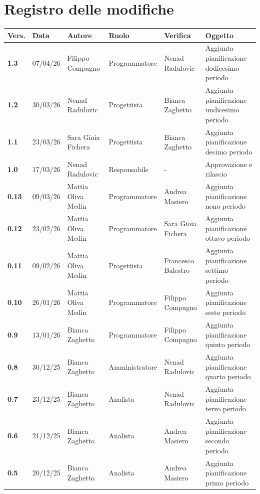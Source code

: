 \documentclass[a4paper,12pt]{article}
\begin{document}


\newpage
\section*{Registro delle modifiche}
\begin{xltabular}{\textwidth}{|l|l|X|l|X|X|}
\hline
\textbf{Vers.} & \textbf{Data} & \textbf{Autore} & \textbf{Ruolo} & \textbf{Verifica} & \textbf{Oggetto} \\
\hline
\endhead
\endfoot
\hline
\endlastfoot
\textbf{1.3} & 07/04/26 & Filippo Compagno & Programmatore & Nenad Radulovic & Aggiunta pianificazione dodicesimo periodo \\
\hline
\textbf{1.2} & 30/03/26 & Nenad Radulovic & Progettista & Bianca Zaghetto & Aggiunta pianificazione undicesimo periodo \\
\hline
\textbf{1.1} & 23/03/26 & Sara Gioia Fichera & Progettista & Bianca Zaghetto & Aggiunta pianificazione decimo periodo \\
\hline
\textbf{1.0} & 17/03/26 & Nenad Radulovic & Responsabile & - & Approvazione e rilascio \\
\hline
\textbf{0.13} & 09/03/26 & Mattia Oliva Medin & Programmatore & Andrea Masiero & Aggiunta pianificazione nono periodo \\
\hline
\textbf{0.12} & 23/02/26 & Mattia Oliva Medin & Programmatore & Sara Gioia Fichera & Aggiunta pianificazione ottavo periodo \\
\hline
\textbf{0.11} & 09/02/26 & Mattia Oliva Medin & Progettista & Francesco Balestro & Aggiunta pianificazione settimo periodo \\
\hline
\textbf{0.10} & 26/01/26 & Mattia Oliva Medin & Programmatore & Filippo Compagno & Aggiunta pianificazione sesto periodo \\
\hline
\textbf{0.9} & 13/01/26 & Bianca Zaghetto & Programmatore & Filippo Compagno & Aggiunta pianificazione quinto periodo \\
\hline
\textbf{0.8} & 30/12/25 & Bianca Zaghetto & Amministratore & Nenad Radulovic & Aggiunta pianificazione quarto periodo \\
\hline
\textbf{0.7} & 23/12/25 & Bianca Zaghetto & Analista & Nenad Radulovic & Aggiunta pianificazione terzo periodo \\
\hline
\textbf{0.6} & 21/12/25 & Bianca Zaghetto & Analista & Andrea Masiero & Aggiunta pianificazione secondo periodo \\
\hline
\textbf{0.5} & 20/12/25 & Bianca Zaghetto & Analista & Andrea Masiero & Aggiunta pianificazione primo periodo \\

\end{xltabular}
\end{document}

